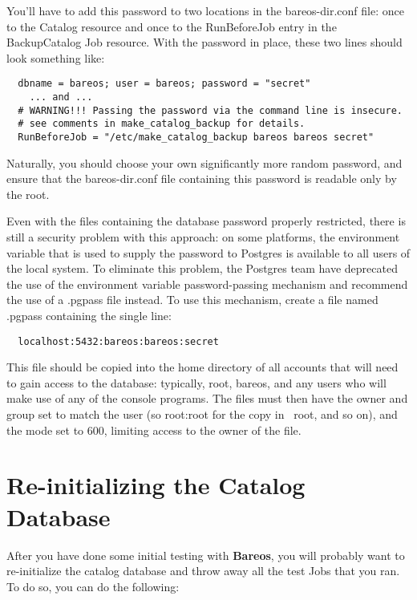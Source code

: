 You'll have to add this password to two locations in the
bareos-dir.conf file: once to the Catalog resource and once to the
RunBeforeJob entry in the BackupCatalog Job resource.  With the
password in place, these two lines should look something like:

\footnotesize
\begin{verbatim}
  dbname = bareos; user = bareos; password = "secret"
    ... and ...
  # WARNING!!! Passing the password via the command line is insecure.
  # see comments in make_catalog_backup for details.
  RunBeforeJob = "/etc/make_catalog_backup bareos bareos secret"
\end{verbatim}
\normalsize

Naturally, you should choose your own significantly more random
password, and ensure that the bareos-dir.conf file containing this
password is readable only by the root.

Even with the files containing the database password properly
restricted, there is still a security problem with this approach: on
some platforms, the environment variable that is used to supply the
password to Postgres is available to all users of the
local system.  To eliminate this problem, the Postgres team have
deprecated the use of the environment variable password-passing
mechanism and recommend the use of a .pgpass file instead.  To use
this mechanism, create a file named .pgpass containing the single
line:

\footnotesize
\begin{verbatim}
  localhost:5432:bareos:bareos:secret
\end{verbatim}
\normalsize

This file should be copied into the home directory of all accounts
that will need to gain access to the database: typically, root,
bareos, and any users who will make use of any of the console
programs.  The files must then have the owner and group set to match
the user (so root:root for the copy in ~root, and so on), and the mode
set to 600, limiting access to the owner of the file.

\section{Re-initializing the Catalog Database}

After you have done some initial testing with {\bf Bareos}, you will probably
want to re-initialize the catalog database and throw away all the test Jobs
that you ran. To do so, you can do the following:

